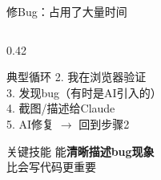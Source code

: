\documentclass[aspectratio=169,11pt]{beamer}
\begin{document}
\begin{frame}{修Bug：占用了大量时间}
\begin{columns}[T]
\begin{column}{0.42\linewidth}
\begin{block}{典型循环}
        2. 我在浏览器验证\\
        3. 发现bug（有时是AI引入的）\\
        4. 截图/描述给Claude\\
        5. AI修复 $\to$ 回到步骤2
      \end{block}
      \vspace{0.5em}
      \begin{exampleblock}{关键技能}
        \small
        能\textbf{清晰描述bug现象}\\
        比会写代码更重要
      \end{exampleblock}
    \end{column}
  \end{columns}
\end{frame}

\end{document}
